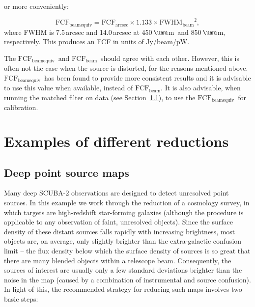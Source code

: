 \documentclass[twoside,11pt]{starlink}
\providecommand{\micron}{\mbox{\,${\umu}$m}}            %
\providecommand{\fcfbe}{$\mathrm{FCF_{beamequiv}}$}
\providecommand{\fcfb}{$\mathrm{FCF_{beam}}$}
\begin{document}
\begin{itemize}
 or more conveniently:

\begin{equation}
\mathrm{FCF_{beamequiv}} = \mathrm{FCF_{arcsec}} \times 1.133 \times
\mathrm{FWHM_{beam}}^2,
\end{equation}
where FWHM is 7.5\,arcsec and 14.0\,arcsec at 450\micron\ and
850\micron, respectively. This produces an FCF in units of
Jy/beam/pW.

The \fcfbe\ and \fcfb\ should agree
with each other. However, this is often not the case when the source
is distorted, for the reasons mentioned
above. \fcfbe\ has been found to provide more
consistent results and it is advisable to use this value when
available, instead of \fcfb. It is also advisable,
when running the matched filter on data (see
Section~\ref{sec:cosmology}), to use the \fcfbe\
for calibration.

\end{itemize}


\section{Examples of different reductions}
\label{sec:eg}

\subsection{Deep point source maps}
\label{sec:cosmology}

Many deep SCUBA-2 observations are designed to detect unresolved
point sources. In this example we work through the reduction of a
cosmology survey, in which targets are high-redshift star-forming
galaxies (although the procedure is applicable to any observation of
faint, unresolved objects).  Since the surface density of these
distant sources falls rapidly with increasing brightness, most objects
are, on average, only slightly brighter than the extra-galactic
confusion limit -- the flux density below which the surface density of
sources is so great that there are many blended objects within a
telescope beam. Consequently, the sources of interest are usually only
a few standard deviations brighter than the noise in the map (caused
by a combination of instrumental and source confusion). In light of
this, the recommended strategy for reducing such maps involves two
basic steps:
\end{document}

